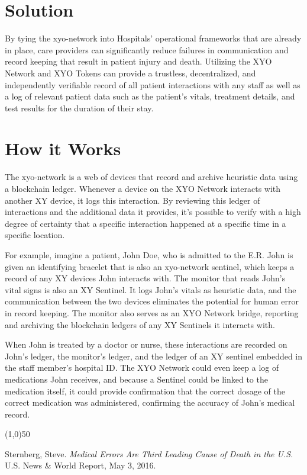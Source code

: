 \documentclass{article}
\begin{document}
\section {Solution}
By tying the \Gls{xyo-network} into Hospitals' operational frameworks that are already in place, care providers can significantly reduce failures in communication and record keeping that result in patient injury and death. Utilizing the XYO Network and XYO Tokens can provide a \gls{trustless}, decentralized, and independently verifiable record of all patient interactions with any staff as well as a log of relevant patient data such as the patient's vitals, treatment details, and test results for the duration of their stay.

\section {How it Works}
The \Gls{xyo-network} is a web of devices that record and archive \gls{heuristic} data using a blockchain ledger. Whenever a device on the XYO Network interacts with another XY device, it logs this interaction. By reviewing this ledger of interactions and the additional data it  provides, it's possible to verify with a high degree of \gls{certainty} that a specific interaction happened at a specific time in a specific location.

For example, imagine a patient, John Doe, who is admitted to the E.R. John is given an identifying bracelet that is also an \Gls{xyo-network} \Gls{sentinel}, which keeps a record of any XY devices John interacts with. The monitor that reads John's vital signs is also an XY Sentinel. It logs John's vitals as heuristic data, and the communication between the two devices eliminates the potential for human error in record keeping. The monitor also serves as an XYO Network \Gls{bridge}, reporting and archiving the blockchain ledgers of any XY Sentinels it interacts with.

When John is treated by a doctor or nurse, these interactions are recorded on John's ledger, the monitor's ledger, and the ledger of an XY \Gls{sentinel} embedded in the staff member's hospital ID. The XYO Network could even keep a log of medications John receives, and because a Sentinel could be linked to the medication itself, it could provide confirmation that the correct dosage of the correct medication was administered, confirming the accuracy of John's medical record.

\begin{center}
\line(1,0){50}
\end{center}


\clearpage

\begin{thebibliography}{9}

Sternberg, Steve.
\textit{Medical Errors Are Third Leading Cause of Death in the U.S.}
U.S. News \& World Report, May 3, 2016.

\end{thebibliography}
 
\printglossaries
\end{document}
